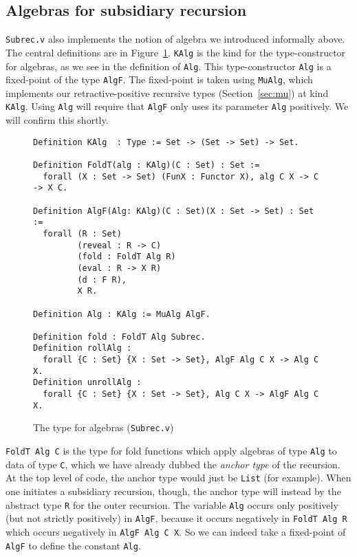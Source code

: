 \documentclass[a4paper,USenglish]{lipics-v2021}
\begin{document}
\subsection{Algebras for subsidiary recursion}

\verb|Subrec.v| also implements the notion of algebra we introduced informally above.  The central definitions are in
Figure~\ref{fig:algf}.  \verb|KAlg| is the kind for the
type-constructor for algebras, as we see in the definition of
\verb|Alg|.  This type-constructor \verb|Alg| is a fixed-point of the
type \verb|AlgF|.  The fixed-point is taken using \verb|MuAlg|, which
implements our retractive-positive recursive types
(Section~\ref{sec:mu}) at kind \verb|KAlg|.  Using \verb|Alg| will
require that \verb|AlgF| only uses its parameter \verb|Alg|
positively.  We will confirm this shortly.

\begin{figure}
\begin{verbatim}
Definition KAlg  : Type := Set -> (Set -> Set) -> Set.

Definition FoldT(alg : KAlg)(C : Set) : Set :=
  forall (X : Set -> Set) (FunX : Functor X), alg C X -> C -> X C.

Definition AlgF(Alg: KAlg)(C : Set)(X : Set -> Set) : Set :=
  forall (R : Set)
         (reveal : R -> C)        
         (fold : FoldT Alg R)
         (eval : R -> X R)      
         (d : F R),             
         X R.

Definition Alg : KAlg := MuAlg AlgF.

Definition fold : FoldT Alg Subrec.
Definition rollAlg :
  forall {C : Set} {X : Set -> Set}, AlgF Alg C X -> Alg C X.
Definition unrollAlg : 
  forall {C : Set} {X : Set -> Set}, Alg C X -> AlgF Alg C X.
\end{verbatim}
\caption{The type for algebras (\texttt{Subrec.v})}
\label{fig:algf}
\end{figure}

\verb|FoldT Alg C| is the type for fold functions which apply
algebras of type \verb|Alg| to data of type \verb|C|, which we have
already dubbed the \emph{anchor type} of the recursion.  At the top
level of code, the anchor type would just be \verb|List| (for
example).  When one initiates a subsidiary recursion, though, the
anchor type will instead by the abstract type \verb|R| for the outer recursion.
The variable \verb|Alg| occurs only positively (but not strictly
positively) in \verb|AlgF|, because it occurs negatively in
\verb|FoldT Alg R| which occurs negatively in \verb|AlgF Alg C X|.  So
we can indeed take a fixed-point of \verb|AlgF| to define the constant
\verb|Alg|.
\end{document}
